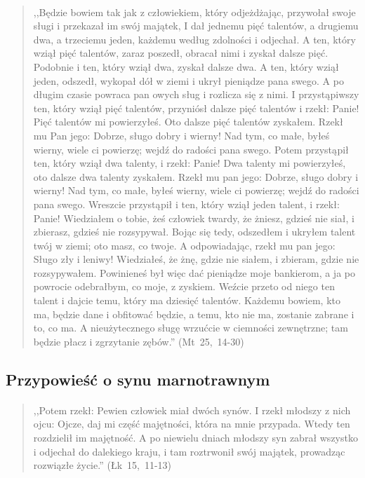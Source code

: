 \documentclass[10pt,a4paper,oneside]{article}
\begin{document}
\paragraph{}
\begin{quote}
,,Będzie bowiem tak jak z człowiekiem, który odjeżdżając, przywołał swoje sługi i przekazał im swój majątek, I dał jednemu pięć talentów, a drugiemu dwa, a trzeciemu jeden, każdemu według zdolności i odjechał. A ten, który wziął pięć talentów, zaraz poszedł, obracał nimi i zyskał dalsze pięć. Podobnie i ten, który wziął dwa, zyskał dalsze dwa. A ten, który wziął jeden, odszedł, wykopał dół w ziemi i ukrył pieniądze pana swego. A po długim czasie powraca pan owych sług i rozlicza się z nimi. I przystąpiwszy ten, który wziął pięć talentów, przyniósł dalsze pięć talentów i rzekł: Panie! Pięć talentów mi powierzyłeś. Oto dalsze pięć talentów zyskałem. Rzekł mu Pan jego: Dobrze, sługo dobry i wierny! Nad tym, co małe, byłeś wierny, wiele ci powierzę; wejdź do radości pana swego. Potem przystąpił ten, który wziął dwa talenty, i rzekł: Panie! Dwa talenty mi powierzyłeś, oto dalsze dwa talenty zyskałem. Rzekł mu pan jego: Dobrze, sługo dobry i wierny! Nad tym, co małe, byłeś wierny, wiele ci powierzę; wejdź do radości pana swego. Wreszcie przystąpił i ten, który wziął jeden talent, i rzekł: Panie! Wiedziałem o tobie, żeś człowiek twardy, że żniesz, gdzieś nie siał, i zbierasz, gdzieś nie rozsypywał. Bojąc się tedy, odszedłem i ukryłem talent twój w ziemi; oto masz, co twoje. A odpowiadając, rzekł mu pan jego: Sługo zły i leniwy! Wiedziałeś, że żnę, gdzie nie siałem, i zbieram, gdzie nie rozsypywałem. Powinieneś był więc dać pieniądze moje bankierom, a ja po powrocie odebrałbym, co moje, z zyskiem. Weźcie przeto od niego ten talent i dajcie temu, który ma dziesięć talentów. Każdemu bowiem, kto ma, będzie dane i obfitować będzie, a temu, kto nie ma, zostanie zabrane i to, co ma. A nieużytecznego sługę wrzućcie w ciemności zewnętrzne; tam będzie płacz i zgrzytanie zębów.'' \mbox{(Mt 25, 14-30)}
\end{quote}
\subsection{Przypowieść o synu marnotrawnym}
\paragraph{}
\begin{quote}
,,Potem rzekł: Pewien człowiek miał dwóch synów. I rzekł młodszy z nich ojcu: Ojcze, daj mi część majętności, która na mnie przypada. Wtedy ten rozdzielił im majętność. A po niewielu dniach młodszy syn zabrał wszystko i odjechał do dalekiego kraju, i tam roztrwonił swój majątek, prowadząc rozwiązłe życie.'' \mbox{(Łk 15, 11-13)}
\end{quote}
\end{document}
